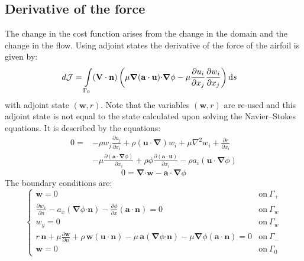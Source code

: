 \documentclass[12pt, a4paper]{article}
\begin{document}
    \subsection{Derivative of the force}
    The change in the cost function arises from the change in the domain and the change in the flow. Using adjoint states the derivative of the force of the airfoil is given by:
    \begin{equation} \label{cost_derivative_definition}
    \begin{split}
    d \mathcal{J} = \int\limits_{\Gamma_0}(\mathbf{V \cdot n}) \, \bigg{(} &
    \mu \boldsymbol{\nabla}(\mathbf{a \cdot u}) \mathbf{\cdot} \boldsymbol{\nabla} \phi -
    \mu \frac{\partial u_i}{\partial x_j} \frac{\partial w_i}{\partial x_j}
    \bigg{)} \, \mathrm{d}s
    \end{split}
    \end{equation}
    with adjoint state $(\mathbf{w},r)$. Note that the variables $(\mathbf{w},r)$ are re-used and this adjoint state is not equal to the state calculated upon solving the Navier--Stokes equations. It is described by the equations:
    \begin{equation} \label{adj_velocity_definition}
    \begin{split}
    0 = & -\rho w_j \frac{\partial u_j}{\partial x_i} +
    \rho (\mathbf{u \cdot} \boldsymbol{\nabla}) w_i +
    \mu \nabla^2 w_i +
    \frac{\partial r}{\partial x_i} \\ 
    & -\mu \frac{\partial (\mathbf{a \cdot} \boldsymbol{\nabla} \phi)}{\partial x_i} +
    \rho \phi \frac{\partial (\mathbf{a \cdot u})}{\partial x_i} - 
    \rho a_i (\mathbf{u \cdot} \boldsymbol{\nabla} \phi)
    \end{split}
    \end{equation}
    \begin{equation} \label{adj_pressure_definition}
    0 = \boldsymbol{\nabla} \mathbf{\cdot w} - 
    \mathbf{a \cdot} \boldsymbol{\nabla} \phi
    \end{equation}
    The boundary conditions are:
    \begin{equation}
    \begin{cases}
    \mathbf{w} = 0	 	&	\text{on}\ \Gamma_+ \\
    \frac{\partial w_x}{\partial n} - a_x (\boldsymbol{\nabla} \phi \mathbf{\cdot n}) - 
    \frac{\partial \phi}{\partial x} (\mathbf{a \cdot n}) = 0	&	\text{on}\ \Gamma_w \\
    w_y = 0				&	\text{on}\ \Gamma_w \\
    r \, \mathbf{n} + \mu \frac{\partial \mathbf{w}}{\partial n} + \rho \, \mathbf{w} (\mathbf{u \cdot n}) - 
    \mu \, \mathbf{a} (\boldsymbol{\nabla} \phi \mathbf{\cdot n}) - 
    \mu \boldsymbol{\nabla} \phi (\mathbf{a \cdot n}) = 0	   	&	\text{on}\ \Gamma_- \\
    \mathbf{w} = 0	 	&	\text{on}\ \Gamma_0
    \end{cases}
    \end{equation}
\end{document}
